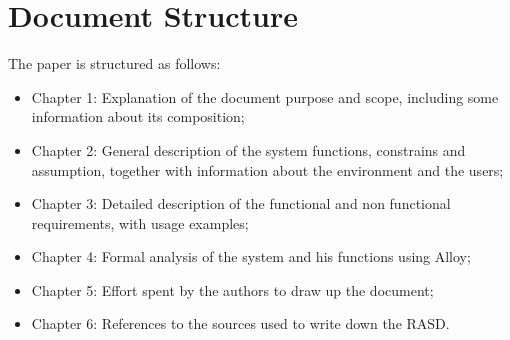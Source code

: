 \section{Document Structure}
The paper is structured as follows:
\begin{itemize}
\item Chapter 1: Explanation of the document purpose and scope, including some information about its composition;
\item Chapter 2: General description of the system functions, constrains and assumption, together with information about the environment and the users;
\item Chapter 3: Detailed description of the functional and non functional requirements, with usage examples;
\item Chapter 4: Formal analysis of the system and his functions using Alloy;
\item Chapter 5: Effort spent by the authors to draw up the document;
\item Chapter 6: References to the sources used to write down the RASD.
\end{itemize}
%

